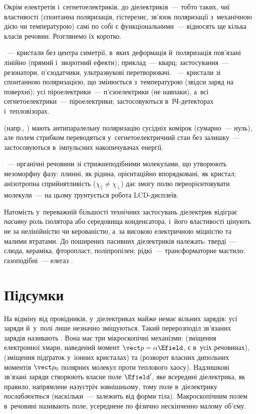 Окрім електретів і~сегнетоелектриків, до  діелектриків~--- тобто таких,
чиї властивості (спонтанна поляризація, гістерезис, зв'язок поляризації з~механічною дією
чи температурою) самі по собі є функціональними~--- відносять ще кілька класів речовин.
Розглянемо їх коротко.

~--- кристали без центра симетрії, в~яких
деформація й~поляризація пов'язані лінійно (прямий і~зворотний ефекти); приклад~--- кварц;
застосування~--- резонатори, п'єзодатчики, ультразвукові перетворювачі.
~--- кристали зі спонтанною поляризацією, що
змінюється з~температурою (звідси заряд на поверхні); усі піроелектрики~--- п'єзоелектрики
(не навпаки), а~всі сегнетоелектрики~--- піроелектрики; застосовуються в~ІЧ-детекторах
і~тепловізорах.

 (напр., ) мають антипаралельну поляризацію
сусідніх комірок (сумарно~--- нуль), але полем стрибком переводяться у~сегнетоелектричний
стан без залишку~--- застосовуються в~імпульсних накопичувачах енергії.

~--- органічні речовини зі стрижнеподібними
молекулами, що утворюють мезоморфну фазу: плинні, як рідина, орієнтаційно впорядковані, як
кристал; анізотропна сприйнятливість ($\chi_\parallel\neq\chi_\perp$) дає змогу полю
переорієнтовувати молекули~--- на цьому ґрунтується робота LCD-дисплеїв.

Натомість у~переважній більшості технічних застосувань діелектрик відіграє \emph{пасивну}
роль ізолятора або середовища конденсатора, і~його властивості цінують не за нелінійністю
чи керованістю, а~за високою електричною міцністю та малими втратами. До поширених
пасивних діелектриків належать: тверді~--- слюда, кераміка, фторопласт, поліпропілен;
рідкі~--- трансформаторне мастило; газоподібні~--- елегаз .


\section*{Підсумки}

На відміну від провідників, у~діелектриках майже немає вільних зарядів: усі заряди
 й~у~полі лише незначно зміщуються. Такий перерозподіл зв'язаних зарядів
називають . Вона має три мікроскопічні механізми: 
(зміщення електронної хмари, наведений момент $\vect p = \alpha\Efield$, є в~усіх
речовинах),  (зміщення підґраток у~іонних кристалах) та
 (розворот власних дипольних моментів $\vect p_0$ полярних молекул
проти теплового хаосу). Надлишкові зв'язані заряди створюють власне поле $\Efield'$, яке
всередині діелектрика, як правило, напрямлене назустріч зовнішньому, тому поле
в~діелектрику \emph{послаблюється} (наскільки~--- залежить від форми тіла).
Макроскопічним полем в~речовині називають поле, усереднене по фізично нескінченно малому
об'єму.

